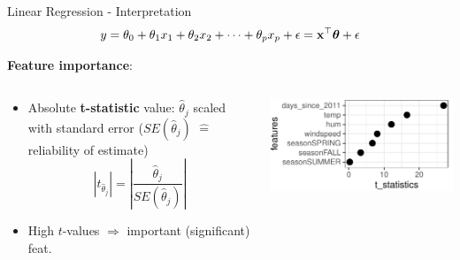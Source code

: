 \documentclass[11pt,compress,t,notes=noshow, aspectratio=169, xcolor=table]{beamer}
\begin{document}
     
\begin{frame}{Linear Regression - Interpretation}
\vspace{-0.2cm}
 $$y = \theta_0 + \theta_1 x_1 + \theta_2 x_2 + \dots + \theta_p x_p + \epsilon = \mathbf{x}^\top \bm{\theta} + \epsilon$$

    \textbf{Feature importance}:
    \begin{columns}[T, totalwidth=\textwidth]
    \begin{column}{0.6\textwidth}
    \begin{itemize}
        \item Absolute \textbf{t-statistic} value: $\hat\theta_j$ scaled with standard error ($SE(\hat\theta_j)$ $\hat =$ reliability of estimate) 
    $$|t_{\hat\theta_j}| = \left| \frac{\hat\theta_j}{SE(\hat\theta_j)} \right|$$
        \item High $t$-values $\Rightarrow$ important (significant) feat.
    \end{itemize}
    \end{column}
    \begin{column}{0.4\textwidth}
        \includegraphics[width=\textwidth]{figure/t_stat.pdf} 
    \end{column}
    \end{columns}
    \vspace{0.3cm}
\end{frame}
\end{document}
